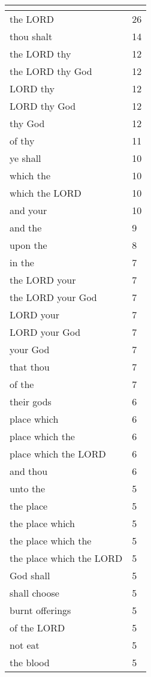 \begin{center}
\begin{longtable}{|p{3.0in}|p{0.5in}|}
\hline \multicolumn{2}{c}{{ }} \\ \hline
\endfoot 
the LORD & 26\\ \hline 
thou shalt & 14\\ \hline 
the LORD thy & 12\\ \hline 
the LORD thy God & 12\\ \hline 
LORD thy & 12\\ \hline 
LORD thy God & 12\\ \hline 
thy God & 12\\ \hline 
of thy & 11\\ \hline 
ye shall & 10\\ \hline 
which the & 10\\ \hline 
which the LORD & 10\\ \hline 
and your & 10\\ \hline 
and the & 9\\ \hline 
upon the & 8\\ \hline 
in the & 7\\ \hline 
the LORD your & 7\\ \hline 
the LORD your God & 7\\ \hline 
LORD your & 7\\ \hline 
LORD your God & 7\\ \hline 
your God & 7\\ \hline 
that thou & 7\\ \hline 
of the & 7\\ \hline 
their gods & 6\\ \hline 
place which & 6\\ \hline 
place which the & 6\\ \hline 
place which the LORD & 6\\ \hline 
and thou & 6\\ \hline 
unto the & 5\\ \hline 
the place & 5\\ \hline 
the place which & 5\\ \hline 
the place which the & 5\\ \hline 
the place which the LORD & 5\\ \hline 
God shall & 5\\ \hline 
shall choose & 5\\ \hline 
burnt offerings & 5\\ \hline 
of the LORD & 5\\ \hline 
not eat & 5\\ \hline 
the blood & 5\\ \hline 

\end{longtable}
\end{center}

